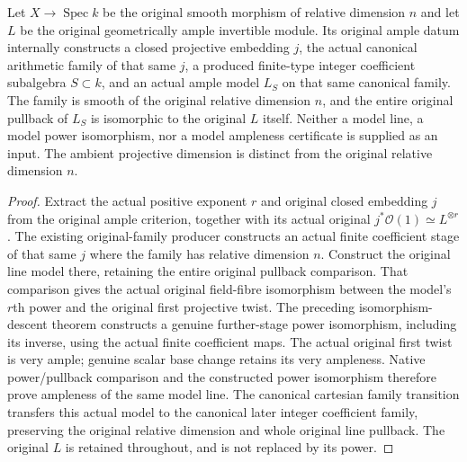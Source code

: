 \begin{theorem}
\label{thm:kn-arithmetic-original-ample-model}
\leanok
{}
Let $X\to\operatorname{Spec}k$ be the original smooth morphism of relative
dimension $n$ and let $L$ be the original geometrically ample invertible
module. Its original ample datum internally constructs a closed projective
embedding $j$, the actual canonical arithmetic family of that same $j$,
a produced finite-type integer coefficient subalgebra $S\subset k$, and
an actual ample model $L_S$ on that same canonical family. The family is
smooth of the original relative dimension $n$, and the entire original
pullback of $L_S$ is isomorphic to the original $L$ itself.
Neither a model line, a model power isomorphism, nor a model ampleness
certificate is supplied as an input. The ambient projective dimension
is distinct from the original relative dimension $n$.
\end{theorem}
\begin{proof}
Extract the actual positive exponent $r$ and original closed embedding
$j$ from the original ample criterion, together with its actual original
$j^*\mathcal O(1)\simeq L^{\otimes r}$. The existing original-family
producer constructs an actual finite coefficient stage of that same $j$
where the family has relative dimension $n$. Construct the original line
model there, retaining the entire original pullback comparison.
That comparison gives the actual original field-fibre isomorphism between
the model's $r$th power and the original first projective twist. The preceding
isomorphism-descent theorem constructs a genuine further-stage power
isomorphism, including its inverse, using the actual finite coefficient maps.
The actual original first twist is very ample; genuine scalar base change
retains its very ampleness. Native power/pullback comparison and the
constructed power isomorphism therefore prove ampleness of the same model
line. The canonical cartesian family transition transfers this actual model
to the canonical later integer coefficient family, preserving the original
relative dimension and whole original line pullback.
The original $L$ is retained throughout, and is not replaced by its power.
\end{proof}

